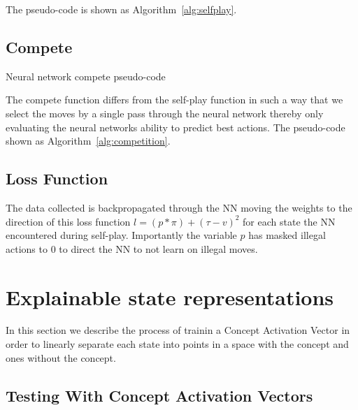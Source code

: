 The pseudo-code is shown as Algorithm~\ref{alg:selfplay}.

\subsection{Compete}

\begin{algorithm}[t]
    \caption{Neural network compete pseudo-code}
    \label{alg:competition}
    \begin{algorithmic}[1]
        \ENDWHILE
        \ENDIF
        \ENDFOR
    \end{algorithmic}
\end{algorithm}

The compete function differs from the self-play function in such a way that we select the moves by a single pass through the neural network thereby only evaluating the neural networks ability to predict best actions. The pseudo-code shown as Algorithm~\ref{alg:competition}.

\subsection{Loss Function}

The data collected is backpropagated through the NN moving the weights to the direction of this loss function $l = (p * \pi) + (\tau - v)^2$ for each state the NN encountered during self-play. Importantly the variable $p$ has masked illegal actions to $0$ to direct the NN to not learn on illegal moves.

\section{Explainable state representations}

In this section we describe the process of trainin a Concept Activation Vector in order to linearly separate each state into points in a space with the concept and ones without the concept.

\subsection{Testing With Concept Activation Vectors}

